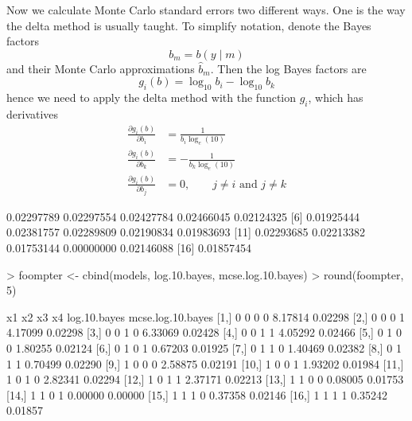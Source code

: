 \documentclass[11pt]{article}
\begin{document}
Now we calculate Monte Carlo standard errors two different ways.  One is
the way the delta method is usually taught.  To simplify notation, denote
the Bayes factors
$$
   b_m = b(y \mid m)
$$
and their Monte Carlo approximations $\hat{b}_m$.  Then the log Bayes factors
are
$$
   g_i(b) = \log_{10} b_i - \log_{10} b_k
$$
hence we need to apply the delta method with the function $g_i$, which has
derivatives
\begin{align*}
   \frac{\partial g_i(b)}{\partial b_i}
   & =
   \frac{1}{b_i \log_e(10)}
   \\
   \frac{\partial g_i(b)}{\partial b_k}
   & =
   - \frac{1}{b_k \log_e(10)}
   \\
   \frac{\partial g_i(b)}{\partial b_j}
   & =
   0, \qquad \text{$j \neq i$ and $j \neq k$}
\end{align*}
\begin{Schunk}
\begin{Soutput}
 [1] 0.02297789 0.02297554 0.02427784 0.02466045 0.02124325
 [6] 0.01925444 0.02381757 0.02289809 0.02190834 0.01983693
[11] 0.02293685 0.02213382 0.01753144 0.00000000 0.02146088
[16] 0.01857454
\end{Soutput}
\begin{Sinput}
> foompter <- cbind(models, log.10.bayes, mcse.log.10.bayes)
> round(foompter, 5)
\end{Sinput}
\begin{Soutput}
      x1 x2 x3 x4 log.10.bayes mcse.log.10.bayes
 [1,]  0  0  0  0      8.17814           0.02298
 [2,]  0  0  0  1      4.17099           0.02298
 [3,]  0  0  1  0      6.33069           0.02428
 [4,]  0  0  1  1      4.05292           0.02466
 [5,]  0  1  0  0      1.80255           0.02124
 [6,]  0  1  0  1      0.67203           0.01925
 [7,]  0  1  1  0      1.40469           0.02382
 [8,]  0  1  1  1      0.70499           0.02290
 [9,]  1  0  0  0      2.58875           0.02191
[10,]  1  0  0  1      1.93202           0.01984
[11,]  1  0  1  0      2.82341           0.02294
[12,]  1  0  1  1      2.37171           0.02213
[13,]  1  1  0  0      0.08005           0.01753
[14,]  1  1  0  1      0.00000           0.00000
[15,]  1  1  1  0      0.37358           0.02146
[16,]  1  1  1  1      0.35242           0.01857
\end{Soutput}
\end{Schunk}
\end{document}
